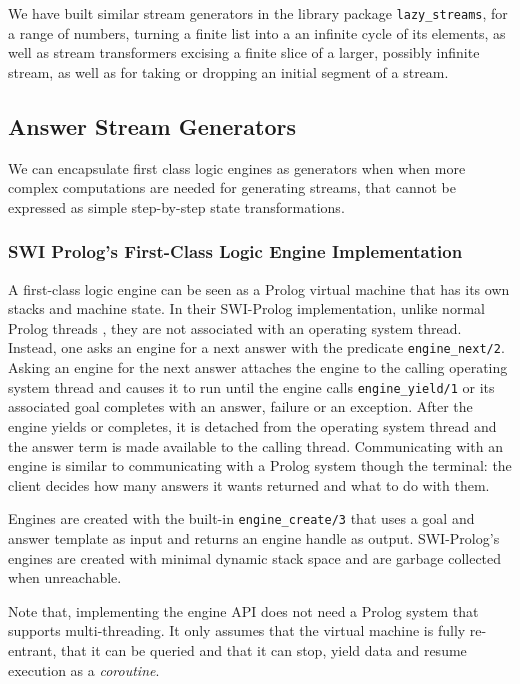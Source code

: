 \documentclass{new_tlp}
\begin{document}
We have built similar stream generators in the library package 
{\tt lazy\_streams}, for a range of numbers, turning a finite list into
a an infinite cycle of its elements, as well as stream 
transformers excising a finite slice of a larger, possibly infinite stream,
as well as for taking or dropping an initial segment of a stream.

\subsection{Answer Stream Generators}

We can encapsulate first class logic engines as generators when when more
complex computations are needed for generating streams, that  cannot be
expressed as simple step-by-step state transformations.

\subsubsection{SWI Prolog's First-Class Logic Engine Implementation}

A first-class logic engine \cite{tarau:cl2000,bp2011} can be seen as a Prolog
virtual machine that has its own stacks and machine state.  In their SWI-Prolog
implementation, unlike normal Prolog threads \cite{swi,swi_threads}, they are
not associated with an operating system thread. Instead, one asks an engine for
a next answer with the predicate {\tt engine\_next/2}. Asking an engine for the
next answer attaches the engine to the calling operating system thread and
causes it to run until the engine calls {\tt engine\_yield/1} or its associated
goal completes with an answer, failure or an exception. After the engine yields
or completes, it is detached from the operating system thread and the answer
term is made available to the calling thread. Communicating with an engine is
similar to communicating with a Prolog system though the terminal: the client
decides how many answers it wants returned and what to do with them.  

Engines are created with the built-in {\tt engine\_create/3} that uses a goal
and answer template as input and returns an engine handle as output.
SWI-Prolog's engines are created with minimal dynamic stack space and are
garbage collected when unreachable.

Note that, implementing the engine API does not need  a Prolog system that
supports multi-threading. It only assumes that the virtual machine is fully
re-entrant, that it can be queried and that it can stop, yield data and resume
execution as a {\em coroutine}.
\end{document}
